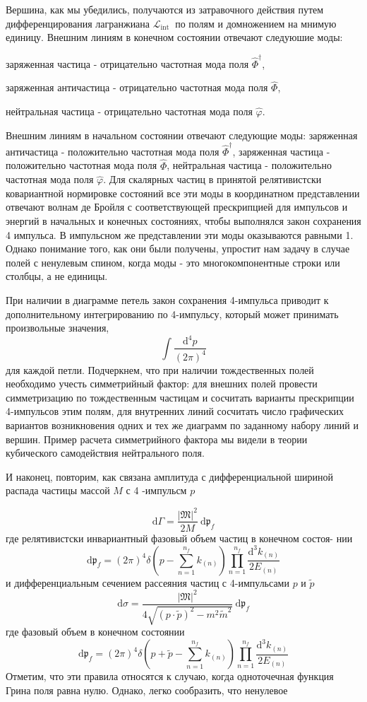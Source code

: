 \documentclass[a4paper,12pt]{article} %
\begin{document}
\begin{ttask}
Вершина, как мы убедились, получаются из затравочного действия путем дифференцирования лагранжиана $\mathcal{L}_{\text {int }}$ по полям и домножением на мнимую
единицу. Внешним линиям в конечном состоянии отвечают следуюшие моды:


заряженная частица - отрицательно частотная мода поля $\hat{\Phi}^{\dagger}$, 

заряженная античастица - отрицательно частотная мода поля $\hat{\Phi}$, 

нейтральная частица - отрицательно частотная мода поля $\hat{\varphi}$.





Внешним линиям в начальном состоянии отвечают следующие моды:
заряженная античастица - положительно частотная мода поля $\hat{\Phi}^{\dagger}$, заряженная частица - положительно частотная мода поля $\hat{\Phi}$, нейтральная частица 
- положительно частотная мода поля $\hat{\varphi}$. Для скалярных частиц 
в принятой релятивистски ковариантной нормировке состояний все эти моды в координатном представлении отвечают 
волнам де Бройля с соответствующей прескрипцией для импульсов   и энергий в  начальных и конечных состояниях, 
чтобы выполнялся закон сохранения 4 импульса. В импульсном же 
представлении эти моды оказываются равными
1. Однако понимание того, как они были получены, упростит нам задачу в случае полей с ненулевым спином, когда моды - это многокомпонентные строки или столбцы, а не единицы.

При наличии в диаграмме петель закон сохранения 4-импульса приводит к дополнительному интегрированию по 4-импульсу, который может принимать произвольные значения,
$$
\int \frac{\mathrm{d}^{4} p}{(2 \pi)^{4}}
$$
для каждой петли. Подчеркнем, что при наличии тождественных полей необходимо учесть симметрийный фактор: для внешних полей провести симметризацию по тождественным частицам и сосчитать варианты прескрипции 4-импульсов этим полям, для внутренних линий сосчитать число графических вариантов возникновения одних и тех же диаграмм по заданному набору линий и вершин. Пример расчета симметрийного фактора мы видели в теории кубического самодействия нейтрального поля.

И наконец, повторим, как связана амплитуда с дифференциальной шириной распада частицы массой $M$ с 4 -импульсм $p$



$$
\mathrm{d} \Gamma=\frac{|\mathfrak{M}|^{2}}{2 M} \mathrm{~d} \mathfrak{p}_{f}
$$
где релятивистски инвариантный фазовый объем частиц в конечном состоя-
нии
$$
\mathrm{d} \mathfrak{p}_{f}=(2 \pi)^{4} \delta\left(p-\sum_{n=1}^{n_{f}} k_{(n)}\right) \prod_{n=1}^{n_{f}} \frac{\mathrm{d}^{3} k_{(n)}}{2 E_{(n)}}
$$
и дифференциальным сечением рассеяния частиц с 4-импульсами $p$ и $\tilde{p}$
$$
\mathrm{d} \sigma=\frac{|\mathfrak{M}|^{2}}{4 \sqrt{(p \cdot \tilde{p})^{2}-m^{2} \tilde{m}^{2}}} \mathrm{~d} \mathfrak{p}_{f}
$$
где фазовый объем в конечном состоянии
$$
\mathrm{d} \mathfrak{p}_{f}=(2 \pi)^{4} \delta\left(p+\tilde{p}-\sum_{n=1}^{n_{f}} k_{(n)}\right) \prod_{n=1}^{n_{f}} \frac{\mathrm{d}^{3} k_{(n)}}{2 E_{(n)}}
$$
Отметим, что эти правила относятся к случаю, когда одноточечная функция Грина поля равна нулю. Однако, легко сообразить, что ненулевое



\end{ttask}
\end{document}
